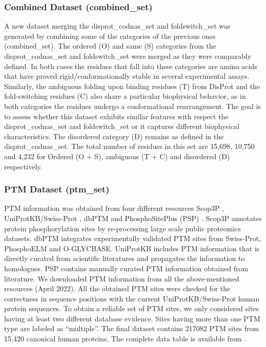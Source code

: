 \subsubsection[Combined Dataset]{Combined Dataset (combined_set)}
A new dataset merging the disprot_codnas_set and foldswitch_set was generated by combining some of the categories of the previous ones (combined_set). The ordered (O) and same (S) categories from the disprot_codnas_set and foldswitch_set were merged as they were comparably defined. In both cases the residues that fall into these categories are amino acids that have proved rigid/conformationally stable in several experimental assays. Similarly, the ambiguous folding upon binding residues (T) from DisProt and the fold-switching residues (C) also share a particular biophysical behavior, as in both categories the residues undergo a conformational rearrangement. The goal is to assess whether this dataset exhibits similar features with respect the disprot_codnas_set and foldswitch_set or it captures different biophysical characteristics. The disordered category (D) remains as defined in the disprot_codnas_set. The total number of residues in this set are 15,698, 10,750 and 4,232 for Ordered (O + S), ambiguous (T + C) and disordered (D) respectively.


\subsubsection[PTM Dataset]{PTM Dataset (ptm_set)}

PTM information was obtained from four different resources Scop3P \cite{ramasamy_scop3p_2020}, UniProtKB/Swiss-Prot \cite{the_uniprot_consortium_uniprot_2021}, dbPTM \cite{huang_dbptm_2019} and PhosphoSitePlus (PSP) \cite{hornbeck_phosphositeplus_2015}. Scop3P annotates protein phosphorylation sites by re-processing large scale public proteomics datasets. dbPTM integrates experimentally validated PTM sites from Swiss-Prot, PhosphoELM and O-GLYCBASE. UniProtKB includes PTM information that is directly curated from scientific literatures and propagates the information to homologues. PSP contains manually curated PTM information obtained from literature. We downloaded PTM information from all the above-mentioned resources (April 2022). All the obtained PTM sites were checked for the correctness in sequence positions with the current UniProtKB/Swiss-Prot human protein sequences. To obtain a reliable set of PTM sites, we only considered sites having at least two different database evidence. Sites having more than one PTM type are labeled as ``multiple''. The final dataset contains 217082 PTM sites from 15,420 canonical human proteins. The complete data table is available from .


